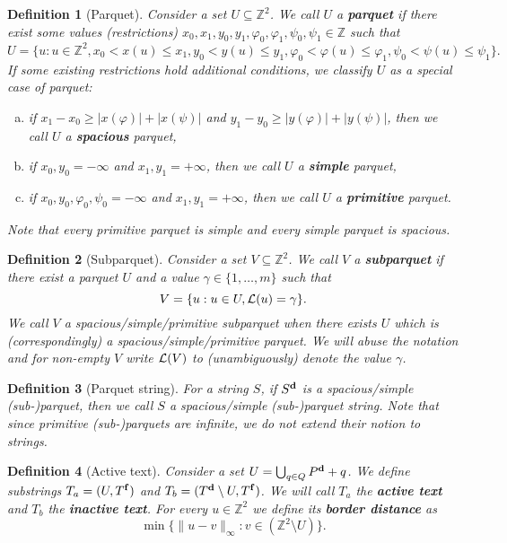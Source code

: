 \documentclass[a4paper]{article}
\newcommand{\Z}{\mathbb{Z}}
\renewcommand{\phi}{\varphi}
\newcommand{\set}[1]{\lbrace #1 \rbrace}
\newtheorem{definition}{Definition}
\begin{document}
\begin{definition}[Parquet]
	Consider a set $U \subseteq \Z^2$. We call $U$ a \textbf{parquet} if there exist some values (restrictions) $x_0, x_1, y_0, y_1, \phi_0, \phi_1, \psi_0, \psi_1 \in \Z$ such that
	$$ U = \set{u : u \in \Z^2, x_0 < x(u) \le x_1, y_0 < y(u) \le y_1, \phi_0 < \phi(u) \le \phi_1, \psi_0 < \psi(u) \le \psi_1}. $$
	If some existing restrictions hold additional conditions, we classify $U$ as a special case of parquet:
	\begin{enumerate}[a)]
		\item if $x_1 - x_0 \ge |x(\phi)| + |x(\psi)|$ and $y_1 - y_0 \ge |y(\phi)| + |y(\psi)|$, then we call $U$ a \textbf{spacious} parquet,
		\item if $x_0, y_0 = -\infty$ and $x_1, y_1 = +\infty$, then we call $U$ a \textbf{simple} parquet,
		\item if $x_0, y_0, \phi_0, \psi_0 = -\infty$ and $x_1, y_1 = +\infty$, then we call $U$ a \textbf{primitive} parquet.
	\end{enumerate}
	Note that every primitive parquet is simple and every simple parquet is spacious.
\end{definition}


\begin{definition}[Subparquet]
	Consider a set $V \subseteq \Z^2$. 
	We call $V$ a \textbf{subparquet} if there exist a parquet $U$ and a value $\gamma \in \set{1, \dots, m}$ such that
	$$ V = \set{u : u \in U, \L(u) = \gamma}.$$
	We call $V$ a spacious/simple/primitive subparquet when there exists $U$ which is (correspondingly) a spacious/simple/primitive parquet.
	We will abuse the notation and for non-empty $V$ write $\mathcal{L}(V)$ to (unambiguously) denote the value $\gamma$. 
\end{definition}


\begin{definition}[Parquet string]
	For a string $S$, if $S^\mathbf{d}$ is a spacious/simple (sub-)parquet, then we call $S$ a spacious/simple (sub-)parquet string.
	Note that since primitive (sub-)parquets are infinite, we do not extend their notion to strings.
\end{definition}


\newcommand{\Ta}{T_a}
\newcommand{\Tb}{T_b}
\begin{definition}[Active text]
	Consider a set $U = \bigcup_{q \in Q} P^\mathbf{d} + q$. 
	We define substrings $\Ta = (U, \f{T})$ and $\Tb = (\d{T} \setminus U, \f{T})$.
	We will call $\Ta$ the \textbf{active text} and $\Tb$ the \textbf{inactive text}.
	For every $u \in \Z^2$ we define its \textbf{border distance} as
	$$\min\set{\|u - v\|_\infty : v \in (\Z^2 \setminus U)}.$$
\end{definition}
\end{document}
